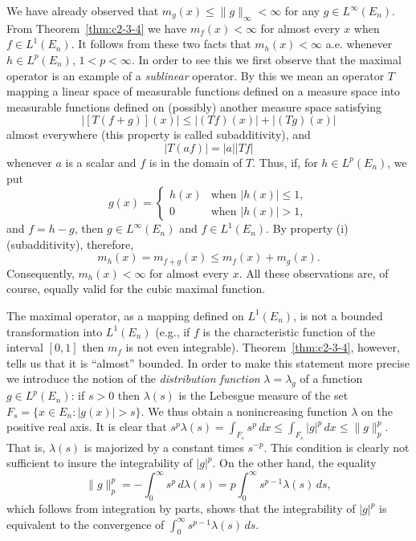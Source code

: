 We have already observed that $m_g(x) \leq \|g\|_\infty < \infty$ for any $g \in L^\infty(E_n)$. From Theorem~\ref{thm:c2-3-4} we have $m_f(x) < \infty$ for almost every $x$ when $f \in L^1(E_n)$. It follows from these two facts that $m_h(x) < \infty$ a.e. whenever $h \in L^p(E_n)$, $1 < p < \infty$. In order to see this we first observe that the maximal operator is an example of a \emph{sublinear} operator. By this we mean an operator $T$ mapping a linear space of measurable functions defined on a measure space into measurable functions defined on (possibly) another measure space satisfying
\[
|[T(f+g)](x)| \leq |(Tf)(x)| + |(Tg)(x)|
\]
almost everywhere (this property is called subadditivity), and
\[
|T(af)| = |a| |Tf|
\]
whenever $a$ is a scalar and $f$ is in the domain of $T$. Thus, if, for $h \in L^p(E_n)$, we put
\[
g(x) = \begin{cases} h(x) & \text{when } |h(x)| \leq 1, \\ 0 & \text{when } |h(x)| > 1, \end{cases}
\]
and $f = h - g$, then $g \in L^\infty(E_n)$ and $f \in L^1(E_n)$. By property (i) (subadditivity), therefore,
\[
m_h(x) = m_{f+g}(x) \leq m_f(x) + m_g(x).
\]
Consequently, $m_h(x) < \infty$ for almost every $x$. All these observations are, of course, equally valid for the cubic maximal function.

The maximal operator, as a mapping defined on $L^1(E_n)$, is not a bounded transformation into $L^1(E_n)$ (e.g., if $f$ is the characteristic function of the interval $[0, 1]$ then $m_f$ is not even integrable). Theorem~\ref{thm:c2-3-4}, however, tells us that it is ``almost'' bounded. In order to make this statement more precise we introduce the notion of the \emph{distribution function} $\lambda = \lambda_g$ of a function $g \in L^p(E_n)$: if $s > 0$ then $\lambda(s)$ is the Lebesgue measure of the set $F_s = \{x \in E_n : |g(x)| > s\}$. We thus obtain a nonincreasing function $\lambda$ on the positive real axis. It is clear that $s^p \lambda(s) = \int_{F_s} s^p\,dx \leq \int_{F_s} |g|^p\,dx \leq \|g\|_p^p$. That is, $\lambda(s)$ is majorized by a constant times $s^{-p}$. This condition is clearly not sufficient to insure the integrability of $|g|^p$. On the other hand, the equality
\begin{equation}\label{eq:c2-3-6}
\|g\|_p^p = -\int_0^\infty s^p\,d\lambda(s) = p \int_0^\infty s^{p-1} \lambda(s)\,ds,
\end{equation}
which follows from integration by parts, shows that the integrability of $|g|^p$ is equivalent to the convergence of $\int_0^\infty s^{p-1}\lambda(s)\,ds$.

